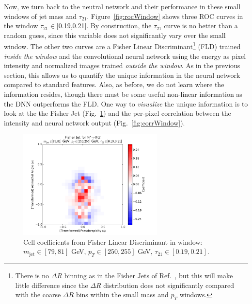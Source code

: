 Now, we turn back to the neutral network and their performance in these small windows of jet mass and $\tau_{21}$.    Figure~\ref{fig:rocWindow} shows three ROC curves in the window $\tau_{21} \in$[0.19,0.21].  By construction, the $\tau_{21}$ curve is no better than a random guess, since this variable does not significantly vary over the small window.  The other two curves are a Fisher Linear Discriminant\footnote{There is no $\Delta R$ binning as in the Fisher Jets of Ref.~\cite{Cogan:2014oua}, but this will make little difference since the $\Delta R$ distribution does not significantly compared with the coarse $\Delta R$ bins within the small mass and $p_T$ windows.} (FLD) trained {\it inside the window} and the convolutional neural network using the energy as pixel intensity and normalized images trained {\it outside the window}.  As in the previous section, this allows us to quantify the unique information in the neural network compared to standard features.  Also, as before, we do not learn where the information resides, though there must be some useful non-linear information as the DNN outperforms the FLD.  One way to {\it visualize} the unique information is to look at the the Fisher Jet (Fig.~\ref{fig:fldWindow}) and the per-pixel correlation between the intensity and neural network output (Fig.~\ref{fig:corrWindow}).

\begin{figure}[h!]
  \centering
  \includegraphics[width=0.65\textwidth]{figures/fld-benwindow.pdf}
  \caption{Cell coefficients from Fisher Linear Discriminant in window: $m_\text{jet}\in [79, 81]$ GeV, $p_{T}\in [250, 255]$ GeV, $\tau_{21}\in[0.19, 0.21]$.}
  \label{fig:fldWindow}
\end{figure}

